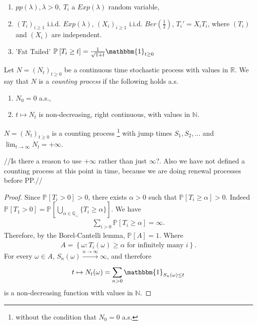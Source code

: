 \begin{ex}[]
	\begin{enumerate}
		\item $pp(\lambda ), \lambda> 0,\ T_i$ a $Exp(\lambda)$ random variable,
		\item $(T_i)_{i\geq 1}$ i.i.d. $Exp(\lambda)$, $(X_i)_{i\geq 1}$  i.i.d. $Ber(\frac{1}{2})$, $T_i'= X_i T_i$, where  $(T_i)$ and  $(X_i)$ are independent.
		\item 'Fat Tailed' $\mathbb{P}_{} \left[ T_{i} \geq t \right] = \frac{1}{\sqrt{1+t}} \mathbbm{1}_{t\geq 0}$
	\end{enumerate}
	
\end{ex}

{\color{blue}
\begin{defn}
	Let $N=(N_t)_{t \geq 0}$ be a continuous time stochastic process with values in $\mathbb{R}$. We say that $N$ is a \emph{counting process} if the following holds a.s.
\begin{enumerate}
	\item $N_0 = 0$ a.s.,
	\item  $t \mapsto N_t$ is non-decreasing, right continuous, with values in $\mathbb{N}$.
\end{enumerate}
\end{defn}
}

\begin{prop}[]
	$N = (N_t)_{t\geq 0}$ is a counting process \footnote{without the condition that $N_0=0$ a.s.} with jump times $S_1, S_2, \ldots $ and $\lim_{t \to \infty} N_t = + \infty$.
\end{prop}
{\color{blue} //Is there a reason to use $+\infty$ rather than just $\infty$?. Also we have not defined a counting process at this point in time, because we are doing renewal processes before PP.//}
\begin{proof}
	Since $\mathbb{P}_{} \left[ T_i>0 \right] >0$, there exists $\alpha > 0$ such that $\mathbb{P}_{} \left[  T_i \geq \alpha  \right] >0$. Indeed $\mathbb{P}_{} \left[ T_1 >0 \right]  = \mathbb{P}_{} \left[ \bigcup_{\alpha \in \mathbb{Q}_+} \{ T_i \geq \alpha\} \right] $. We have
	\begin{align}
		\sum_{i>0}^{} \mathbb{P}_{} \left[ T_i \geq \alpha  \right] = \infty.
	\end{align}
	Therefore, by {\color{blue} the} Borel-Cantelli lemma, $\mathbb{P}_{} \left[A\right] =1$. Where
	\begin{align}
	A=	\left\{\omega: T_i(\omega) \geq \alpha \textrm{ for infinitely many } i \right\}.
	\end{align}
	For every $\omega \in A$, $S_n(\omega) \stackrel{n \to \infty}{\to} \infty$, and therefore
	\begin{align}
		t \mapsto N_t(\omega) = \sum_{n> 0}^{} \mathbbm{1}_{S_n(\omega) \leq t} 
	\end{align}
is a non-decreasing function with values in $\mathbb{N}$.	
\end{proof}


